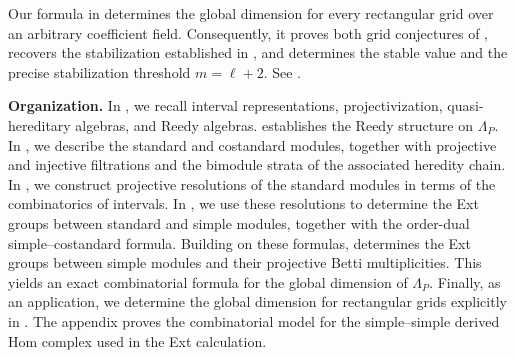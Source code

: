 Our formula in  determines the global dimension
for every rectangular grid over an arbitrary coefficient field.  Consequently, it proves both grid conjectures
of \cite{AENY}, recovers the stabilization established in \cite{BDHS}, and
determines the stable value and the precise stabilization threshold $m = \ell + 2$.
See .

\medskip
\noindent
{\bf Organization.}
In , we recall interval representations,
projectivization, quasi-hereditary algebras, and Reedy algebras.
 establishes the Reedy structure on $\Lambda_P$.
In , we describe the standard and costandard modules,
together with projective and injective filtrations and the bimodule strata
of the associated heredity chain.
In , we construct
projective resolutions of the standard modules in terms of the combinatorics
of intervals.  In , we use these
resolutions to determine the Ext groups between standard and simple modules,
together with the order-dual simple--costandard formula.
Building on these formulas,  determines
the Ext groups between simple modules and their projective Betti
multiplicities.
This yields an exact combinatorial formula for the global dimension of
$\Lambda_P$.
Finally, as an application, we determine the global dimension for rectangular grids explicitly in .
The appendix proves the combinatorial model for the simple--simple derived Hom complex used in the Ext calculation.
